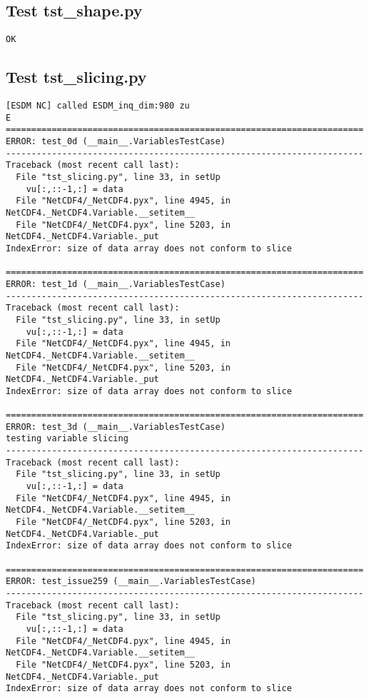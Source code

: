 \subsection{Test tst\_shape.py}

\begin{verbatim}
OK
\end{verbatim}

\subsection{Test tst\_slicing.py}

\begin{verbatim}
[ESDM NC] called ESDM_inq_dim:980 zu
E
======================================================================
ERROR: test_0d (__main__.VariablesTestCase)
----------------------------------------------------------------------
Traceback (most recent call last):
  File "tst_slicing.py", line 33, in setUp
    vu[:,::-1,:] = data
  File "NetCDF4/_NetCDF4.pyx", line 4945, in NetCDF4._NetCDF4.Variable.__setitem__
  File "NetCDF4/_NetCDF4.pyx", line 5203, in NetCDF4._NetCDF4.Variable._put
IndexError: size of data array does not conform to slice

======================================================================
ERROR: test_1d (__main__.VariablesTestCase)
----------------------------------------------------------------------
Traceback (most recent call last):
  File "tst_slicing.py", line 33, in setUp
    vu[:,::-1,:] = data
  File "NetCDF4/_NetCDF4.pyx", line 4945, in NetCDF4._NetCDF4.Variable.__setitem__
  File "NetCDF4/_NetCDF4.pyx", line 5203, in NetCDF4._NetCDF4.Variable._put
IndexError: size of data array does not conform to slice

======================================================================
ERROR: test_3d (__main__.VariablesTestCase)
testing variable slicing
----------------------------------------------------------------------
Traceback (most recent call last):
  File "tst_slicing.py", line 33, in setUp
    vu[:,::-1,:] = data
  File "NetCDF4/_NetCDF4.pyx", line 4945, in NetCDF4._NetCDF4.Variable.__setitem__
  File "NetCDF4/_NetCDF4.pyx", line 5203, in NetCDF4._NetCDF4.Variable._put
IndexError: size of data array does not conform to slice

======================================================================
ERROR: test_issue259 (__main__.VariablesTestCase)
----------------------------------------------------------------------
Traceback (most recent call last):
  File "tst_slicing.py", line 33, in setUp
    vu[:,::-1,:] = data
  File "NetCDF4/_NetCDF4.pyx", line 4945, in NetCDF4._NetCDF4.Variable.__setitem__
  File "NetCDF4/_NetCDF4.pyx", line 5203, in NetCDF4._NetCDF4.Variable._put
IndexError: size of data array does not conform to slice


\end{verbatim}
